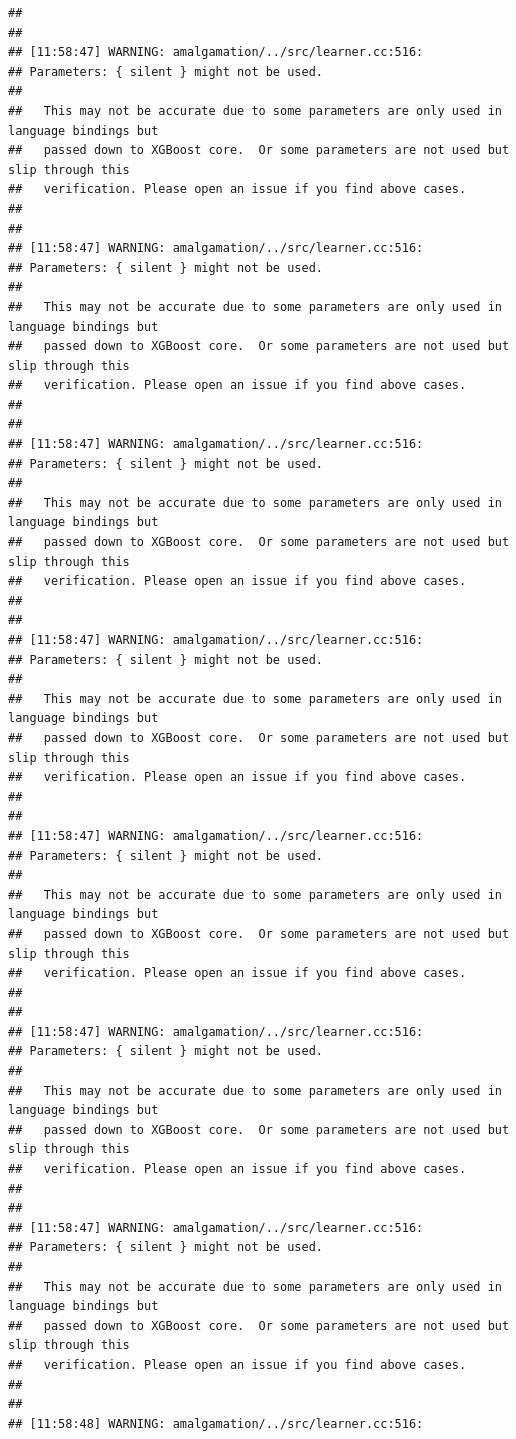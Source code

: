 \documentclass[AMS,STIX2COL]{WileyNJD-v2}\usepackage[]{graphicx}\usepackage[]{color}
\makeatletter
\newenvironment{kframe}{%
 \def\at@end@of@kframe{}%
 \ifinner\ifhmode%
  \def\at@end@of@kframe{\end{minipage}}%
  \begin{minipage}{\columnwidth}%
 \fi\fi%
 \def\FrameCommand##1{\hskip\@totalleftmargin \hskip-\fboxsep
 \colorbox{shadecolor}{##1}\hskip-\fboxsep
     \hskip-\linewidth \hskip-\@totalleftmargin \hskip\columnwidth}%
 \MakeFramed {\advance\hsize-\width
   \@totalleftmargin\z@ \linewidth\hsize
   \@setminipage}}%
 {\par\unskip\endMakeFramed%
 \at@end@of@kframe}
\newenvironment{knitrout}{}{} %
\makeatother
\begin{document}
\begin{knitrout}
\begin{kframe}
\begin{verbatim}
## 
## 
## [11:58:47] WARNING: amalgamation/../src/learner.cc:516: 
## Parameters: { silent } might not be used.
## 
##   This may not be accurate due to some parameters are only used in language bindings but
##   passed down to XGBoost core.  Or some parameters are not used but slip through this
##   verification. Please open an issue if you find above cases.
## 
## 
## [11:58:47] WARNING: amalgamation/../src/learner.cc:516: 
## Parameters: { silent } might not be used.
## 
##   This may not be accurate due to some parameters are only used in language bindings but
##   passed down to XGBoost core.  Or some parameters are not used but slip through this
##   verification. Please open an issue if you find above cases.
## 
## 
## [11:58:47] WARNING: amalgamation/../src/learner.cc:516: 
## Parameters: { silent } might not be used.
## 
##   This may not be accurate due to some parameters are only used in language bindings but
##   passed down to XGBoost core.  Or some parameters are not used but slip through this
##   verification. Please open an issue if you find above cases.
## 
## 
## [11:58:47] WARNING: amalgamation/../src/learner.cc:516: 
## Parameters: { silent } might not be used.
## 
##   This may not be accurate due to some parameters are only used in language bindings but
##   passed down to XGBoost core.  Or some parameters are not used but slip through this
##   verification. Please open an issue if you find above cases.
## 
## 
## [11:58:47] WARNING: amalgamation/../src/learner.cc:516: 
## Parameters: { silent } might not be used.
## 
##   This may not be accurate due to some parameters are only used in language bindings but
##   passed down to XGBoost core.  Or some parameters are not used but slip through this
##   verification. Please open an issue if you find above cases.
## 
## 
## [11:58:47] WARNING: amalgamation/../src/learner.cc:516: 
## Parameters: { silent } might not be used.
## 
##   This may not be accurate due to some parameters are only used in language bindings but
##   passed down to XGBoost core.  Or some parameters are not used but slip through this
##   verification. Please open an issue if you find above cases.
## 
## 
## [11:58:47] WARNING: amalgamation/../src/learner.cc:516: 
## Parameters: { silent } might not be used.
## 
##   This may not be accurate due to some parameters are only used in language bindings but
##   passed down to XGBoost core.  Or some parameters are not used but slip through this
##   verification. Please open an issue if you find above cases.
## 
## 
## [11:58:48] WARNING: amalgamation/../src/learner.cc:516: 

\end{verbatim}
\end{kframe}
\end{knitrout}
\end{document}

